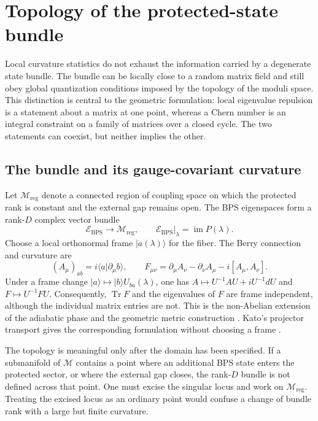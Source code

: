 \section{Topology of the protected-state bundle}
\label{sec:topology}

Local curvature statistics do not exhaust the information carried by a
degenerate state bundle.  The bundle can be locally close to a random matrix
field and still obey global quantization conditions imposed by the topology of
the moduli space.  This distinction is central to the geometric formulation:
local eigenvalue repulsion is a statement about a matrix at one point, whereas
a Chern number is an integral constraint on a family of matrices over a closed
cycle.  The two statements can coexist, but neither implies the other.

\subsection{The bundle and its gauge-covariant curvature}

Let $\mathcal{M}_{\mathrm{reg}}$ denote a connected region of coupling space
on which the protected rank is constant and the external gap remains open.
The BPS eigenspaces form a rank-$D$ complex vector bundle
\begin{equation}
 \mathcal{E}_{\mathrm{BPS}}\longrightarrow\mathcal{M}_{\mathrm{reg}},
 \qquad
 \mathcal{E}_{\mathrm{BPS}}|_{\lambda}=\operatorname{im}P(\lambda).
 \label{eq:topological-bps-bundle}
\end{equation}
Choose a local orthonormal frame $|a(\lambda)\rangle$ for the fiber.  The
Berry connection and curvature are
\begin{equation}
 (A_\mu)_{ab}=i\langle a|\partial_\mu b\rangle,
 \qquad
 F_{\mu\nu}=\partial_\mu A_\nu-\partial_\nu A_\mu-i[A_\mu,A_\nu].
 \label{eq:topological-connection}
\end{equation}
Under a frame change $|a\rangle\mapsto|b\rangle U_{ba}(\lambda)$, one has
$A\mapsto U^{-1}AU+iU^{-1}dU$ and $F\mapsto U^{-1}FU$.  Consequently,
$\operatorname{Tr}F$ and the eigenvalues of $F$ are frame independent,
although the individual matrix entries are not.  This is the non-Abelian
extension of the adiabatic phase and the geometric metric construction
\cite{berry1984,wilczekzee1984,provostvallee1980}.  Kato's projector
transport gives the corresponding formulation without choosing a frame
\cite{kato1950}.

The topology is meaningful only after the domain has been specified.  If a
submanifold of $\mathcal{M}$ contains a point where an additional BPS state
enters the protected sector, or where the external gap closes, the rank-$D$
bundle is not defined across that point.  One must excise the singular locus
and work on $\mathcal{M}_{\mathrm{reg}}$.  Treating the excised locus as an
ordinary point would confuse a change of bundle rank with a large but finite
curvature.

